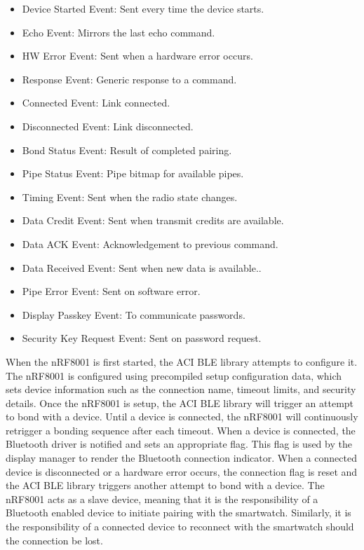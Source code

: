 \singlespacing
\begin{itemize}
  \item{} Device Started Event: Sent every time the device starts.
  \item{} Echo Event: Mirrors the last echo command.
  \item{} HW Error Event: Sent when a hardware error occurs.
  \item{} Response Event: Generic response to a command.
  \item{} Connected Event: Link connected.
  \item{} Disconnected Event: Link disconnected.
  \item{} Bond Status Event: Result of completed pairing.
  \item{} Pipe Status Event: Pipe bitmap for available pipes.
  \item{} Timing Event: Sent when the radio state changes.
  \item{} Data Credit Event: Sent when transmit credits are available.
  \item{} Data ACK Event: Acknowledgement to previous command.
  \item{} Data Received Event: Sent when new data is available..
  \item{} Pipe Error Event: Sent on software error.
  \item{} Display Passkey Event: To communicate passwords.
  \item{} Security Key Request Event: Sent on password request.
\end{itemize}

\doublespacing
When the nRF8001 is first started, the ACI BLE library attempts to configure it. The nRF8001 is configured using precompiled setup configuration data, which sets device information such as the connection name, timeout limits, and security details. Once the nRF8001 is setup, the ACI BLE library will trigger an attempt to bond with a device. Until a device is connected, the nRF8001 will continuously retrigger a bonding sequence after each timeout. When a device is connected, the Bluetooth driver is notified and sets an appropriate flag. This flag is used by the display manager to render the Bluetooth connection indicator. When a connected device is disconnected or a hardware error occurs, the connection flag is reset and the ACI BLE library triggers another attempt to bond with a device. The nRF8001 acts as a slave device, meaning that it is the responsibility of a Bluetooth enabled device to initiate pairing with the smartwatch. Similarly, it is the responsibility of a connected device to reconnect with the smartwatch should the connection be lost.

